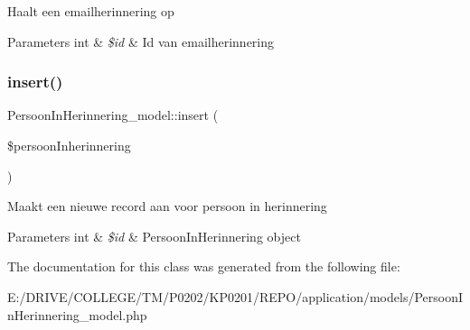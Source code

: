 Haalt een emailherinnering op 
\begin{DoxyParams}[1]{Parameters}
int & {\em \$id} & Id van emailherinnering \\
\hline
\end{DoxyParams}
\mbox{\label{class_persoon_in_herinnering__model_ab19b43169595548f27dd52a93a81ab9b}} 
\subsubsection{\texorpdfstring{insert()}{insert()}}
{\footnotesize\ttfamily Persoon\+In\+Herinnering\+\_\+model\+::insert (\begin{DoxyParamCaption}\item[{}]{\$persoon\+Inherinnering }\end{DoxyParamCaption})}

Maakt een nieuwe record aan voor persoon in herinnering 
\begin{DoxyParams}[1]{Parameters}
int & {\em \$id} & Persoon\+In\+Herinnering object \\
\hline
\end{DoxyParams}


The documentation for this class was generated from the following file\+:\begin{DoxyCompactItemize}
\item 
E\+:/\+D\+R\+I\+V\+E/\+C\+O\+L\+L\+E\+G\+E/\+T\+M/\+P0202/\+K\+P0201/\+R\+E\+P\+O/application/models/Persoon\+In\+Herinnering\+\_\+model.\+php\end{DoxyCompactItemize}
